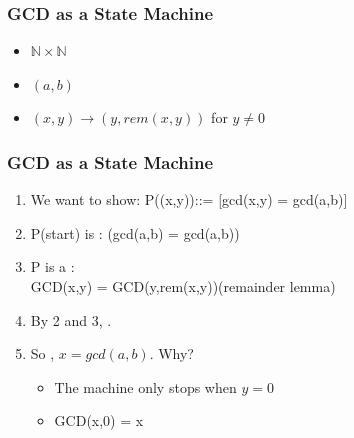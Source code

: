 \documentclass{beamer}
\begin{document}
\begin{frame}
  \frametitle{GCD as a State Machine}

  {\larger

    \begin{itemize}
    \item {} $\mathbb{N}\times \mathbb{N}$ \bigskip
    \item {} $(a,b)$ \bigskip
    \item {}
      $(x,y) \rightarrow (y,rem(x,y))$ for $y\neq 0$ \bigskip
    \end{itemize}    
  }
\end{frame}

\begin{frame}
  \frametitle{GCD as a State Machine}

  {\larger
    {\bf {}}

    \vfill

    \begin{enumerate}
    \item \alert{We want to show}: P((x,y))::= [gcd(x,y) = gcd(a,b)]
    \item P(start) is : (gcd(a,b) = gcd(a,b))
    \item P is a :\\
      GCD(x,y) = GCD(y,rem(x,y))\hfill (remainder lemma)
    \item By 2 and 3, .
      
      \bigskip
      
    \item So , $x = gcd(a,b)$. Why?
      \begin{itemize}
      \item The machine only stops when $y = 0$
      \item GCD(x,0) = x
      \end{itemize}
    \end{enumerate}
    
  }
\end{frame}
\end{document}
